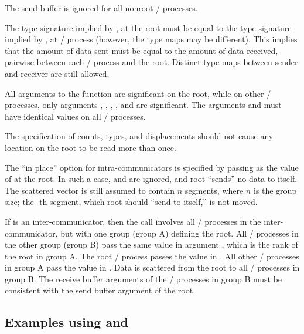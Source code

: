 The send buffer is ignored for all nonroot \MPI/ processes.

The type signature implied by \mpicode{[i]},  at the root
must be equal to the type signature implied by
,  at \MPI/ process
 (however, the type maps may be different).
This implies that the amount of data sent must be equal to the
amount of data received, pairwise between each \MPI/ process and the root.
Distinct type maps between sender and receiver are still allowed.

All arguments to the function are significant on the root,
while on other \MPI/ processes, only arguments , ,
, ,
and
 are significant.
The arguments  and 
must have identical values on all \MPI/ processes.

The specification of counts, types, and displacements
should not cause any location on the root to be read more than
once.

The ``in place'' option  for intra-communicators is specified by passing
 as
the value of  at the root.  In such a case,
 and  are ignored, and root
``sends'' no data to itself. The scattered vector is still assumed to
contain $n$ segments, where $n$ is the group size; the -th
segment, which root should ``send to itself,'' is not moved.

If  is an inter-communicator, then the call involves all
\MPI/ processes in the inter-communicator, but with one group (group A) defining the
root.  All \MPI/ processes in the other group (group B) pass the same value
in argument
, which is the rank of the root in group A.  The root
\MPI/ process passes the value  in .
All other \MPI/ processes in group A pass the value  in
.
Data is scattered from the root to all \MPI/ processes in
group B.  The receive buffer arguments of the \MPI/ processes in group B
must be consistent with the send buffer argument of the root.

\subsection{Examples using \texorpdfstring{}{MPI\_SCATTER} and \texorpdfstring{}{MPI\_SCATTERV}}

